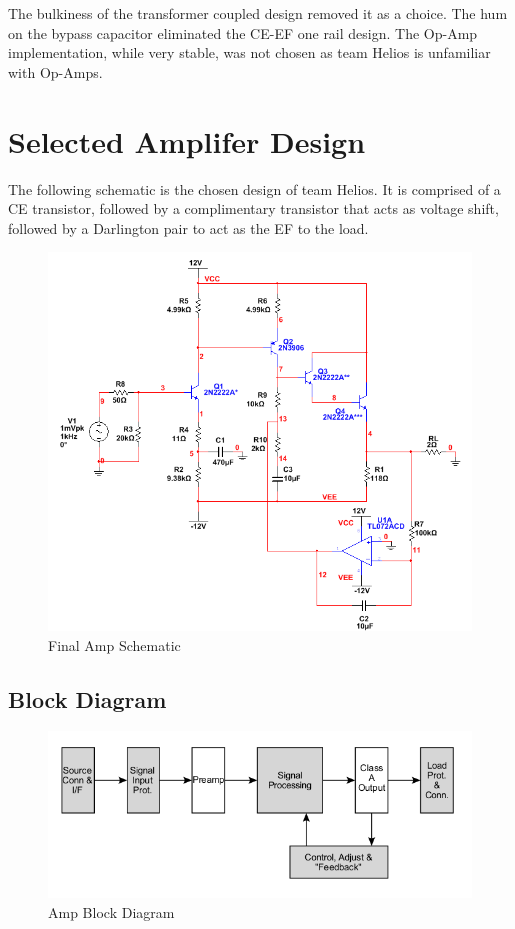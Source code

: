 \documentclass[journal]{IEEEtran}
\begin{document}
The bulkiness of the transformer coupled design removed it as a choice. The hum on the bypass capacitor eliminated the CE-EF one rail design. The Op-Amp implementation, while very stable, was not chosen as team Helios is unfamiliar with Op-Amps.

\section{Selected Amplifer Design}

The following schematic is the chosen design of team Helios. It is comprised of a CE transistor, followed by a complimentary transistor that acts as voltage shift, followed by a Darlington pair to act as the EF to the load.

\begin{figure}[H]
\centering
\includegraphics[scale=.35]{final-schem.png}
\caption{Final Amp Schematic}
\label{fig_amp_schem}
\end{figure}

\subsection{Block Diagram}

\begin{figure}[H]
\centering
\includegraphics[scale=.38]{amp-block.png}
\caption{Amp Block Diagram}
\label{fig_amp_block}
\end{figure}
\end{document}
